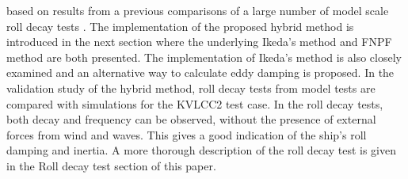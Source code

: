based on results from a previous comparisons of a large number of model
scale roll decay tests \citep{7505983/QMGQ76Q9}.
\quad The implementation of the proposed hybrid method is introduced in
the next section where the underlying Ikeda's method and FNPF method are
both presented. The implementation of Ikeda's method is also closely
examined and an alternative way to calculate eddy damping is proposed.
In the validation study of the hybrid method, roll decay tests from
model tests are compared with simulations for the KVLCC2 test case. In
the roll decay tests, both decay and frequency can be observed, without
the presence of external forces from wind and waves. This gives a good
indication of the ship's roll damping and inertia. A more thorough
description of the roll decay test is given in the Roll decay test
section of this paper.
